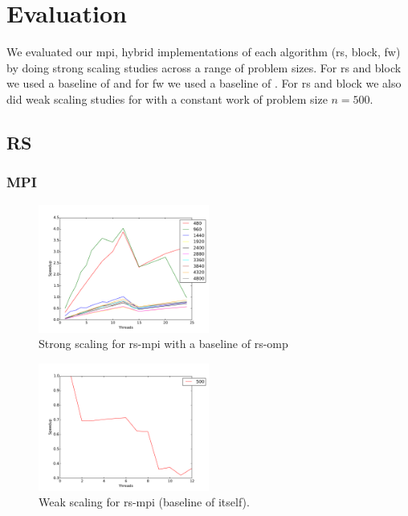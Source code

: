 \section{Evaluation}\label{sec:eval}

We evaluated our mpi, hybrid implementations of each algorithm (rs, block, fw) by doing strong scaling studies across a range of problem sizes. For rs and block we used a baseline of  and for fw we used a baseline of . For rs and block we also did weak scaling studies for with a constant work of problem size $n=500$.

\subsection{RS}

\subsubsection{MPI}

\begin{figure}[ht]
\centering
\includegraphics[width=0.5\textwidth]{plots/strong_rs-mpi_baseline-rs-omp--1.pdf}
\caption{Strong scaling for rs-mpi with a baseline of rs-omp}
\label{strong-rs-mpi}
\end{figure}

\begin{figure}[ht]
\centering
\includegraphics[width=0.5\textwidth]{plots/weak_rs-mpi.pdf}
\caption{Weak scaling for rs-mpi (baseline of itself).}
\label{weak-rs-mpi}
\end{figure}

